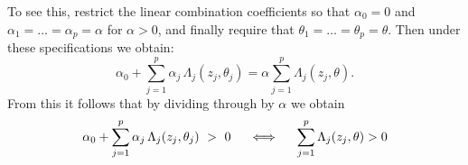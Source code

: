 To see this, restrict the linear combination coefficients so that $\alpha_0 = 0$
and $\alpha_1 = \dots = \alpha_p = \alpha$ for $\alpha > 0$, and finally require
that $\theta_1 = \dots = \theta_p = \theta$.  Then under these specifications we
obtain:
\begin{equation}
  \label{eq:composite-is-distance}
  \alpha_0 + \sum_{j=1}^p \alpha_j \, \Lambda_j (z_j, \theta_j)
  = \alpha \sum_{j=1}^p \Lambda_j (z_j, \theta).
\end{equation}
From this it follows that by dividing through by $\alpha$ we obtain
\begin{equation}
  \label{eq:boundary-equivalence}
  \alpha_0 + \sum_{j=1}^p \alpha_j \, \Lambda_j (z_j, \theta_j) ~>~ 0
  \hspace{5mm} \Longleftrightarrow \hspace{5mm}
  \sum_{j=1}^p \Lambda_j (z_j, \theta) > 0
\end{equation}
